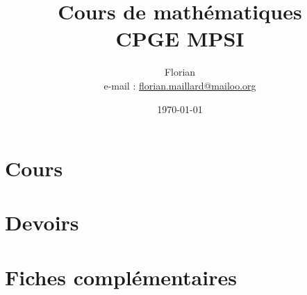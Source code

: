 \documentclass[11pt, a4paper, openright, twoside]{book}
\title{\textbf{\Huge Cours de mathématiques \\ CPGE MPSI}}
\author{Florian \bsc{Maillard}\\ e-mail : \href{mailto:florian.maillard@mailoo.org}{florian.maillard@mailoo.org}}
\date{\today}
\begin{document}
\frontmatter
\maketitle
%
\mainmatter

\part{Cours}
































\part{Devoirs}
\renewcommand{\chaptername}{Devoir}

\appendix
\part{Fiches compl\'ementaires}










%
\backmatter
\dominitoc
\dominilof
\dominilot
\tableofcontents
\listoffigures
\listoftables
\end{document}
